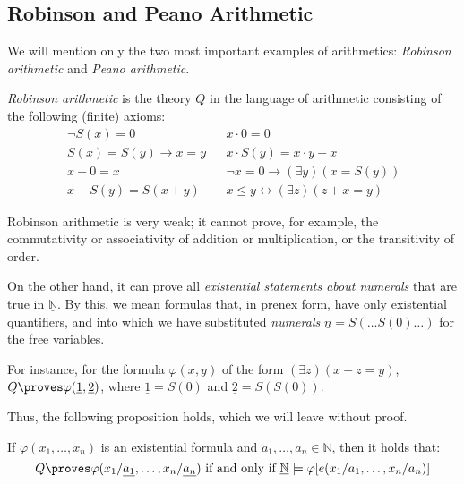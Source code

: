 \subsection{Robinson and Peano Arithmetic}

We will mention only the two most important examples of arithmetics: \emph{Robinson arithmetic} and \emph{Peano arithmetic}.

\begin{definition}
\emph{Robinson arithmetic} is the theory $Q$ in the language of arithmetic consisting of the following (finite) axioms:
\begin{align*}
    &\neg S(x) = 0& &x \cdot 0 = 0\\
    &S(x) = S(y) \rightarrow x = y& &x \cdot S(y) = x \cdot y + x\\
    &x + 0 = x& &\neg x = 0 \rightarrow (\exists y)(x = S(y))\\
    &x + S(y) = S(x + y)& &x \le y \leftrightarrow (\exists z)(z + x = y)\qquad
\end{align*}
\end{definition}

Robinson arithmetic is very weak; it cannot prove, for example, the commutativity or associativity of addition or multiplication, or the transitivity of order.

On the other hand, it can prove all \emph{existential statements about numerals} that are true in $\underline{\mathbb{N}}$. By this, we mean formulas that, in prenex form, have only existential quantifiers, and into which we have substituted \emph{numerals} $\underline{n} = S(\dots S(0) \dots)$ for the free variables.

\begin{example}
For instance, for the formula $\varphi(x,y)$ of the form $(\exists z)(x + z = y)$, $Q \proves \varphi(\underline{1}, \underline{2})$, where $\underline{1} = S(0)$ and $\underline{2} = S(S(0))$.    
\end{example}

Thus, the following proposition holds, which we will leave without proof.

\begin{proposition}\label{proposition:robinson-satisfies-existence-about-numerals}
    If $\varphi(x_1, \dots, x_n)$ is an existential formula and $a_1, \dots, a_n \in \mathbb{N}$, then it holds that:
    $$
    Q \proves \varphi(x_1 / \underline{a_1}, \dots, x_n / \underline{a_n}) \text{ if and only if } \underline{\mathbb{N}} \models \varphi[e(x_1 / a_1, \dots, x_n / a_n)]
    $$
\end{proposition}

